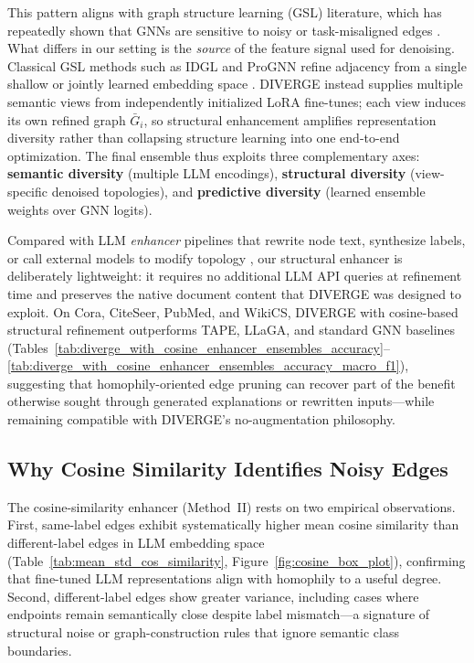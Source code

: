 This pattern aligns with graph structure learning (GSL) literature, which has repeatedly
shown that GNNs are sensitive to noisy or task-misaligned edges
\citep{jin2020prognn,chen2020idgl,dong2023gps}. What differs in our setting is the
\emph{source} of the feature signal used for denoising. Classical GSL methods such as
IDGL and ProGNN refine adjacency from a single shallow or jointly learned embedding
space \citep{chen2020idgl,jin2020prognn}. DIVERGE instead supplies multiple semantic
views from independently initialized LoRA fine-tunes; each view induces its own refined
graph $\bar{G}_i$, so structural enhancement amplifies representation diversity rather
than collapsing structure learning into one end-to-end optimization. The final ensemble
thus exploits three complementary axes: \textbf{semantic diversity} (multiple LLM
encodings), \textbf{structural diversity} (view-specific denoised topologies), and
\textbf{predictive diversity} (learned ensemble weights over GNN logits).

Compared with LLM \emph{enhancer} pipelines that rewrite node text, synthesize labels,
or call external models to modify topology
\citep{he2024harnessing,Sun2026TopologicalEnhancerTAG,guo2024graphedit,zhang2025leveraging},
our structural enhancer is deliberately lightweight: it requires no additional LLM API
queries at refinement time and preserves the native document content that DIVERGE was
designed to exploit. On Cora, CiteSeer, PubMed, and WikiCS, DIVERGE with cosine-based
structural refinement outperforms TAPE, LLaGA, and standard GNN baselines
(Tables~\ref{tab:diverge_with_cosine_enhancer_ensembles_accuracy}--\ref{tab:diverge_with_cosine_enhancer_ensembles_accuracy_macro_f1}),
suggesting that homophily-oriented edge pruning can recover part of the benefit otherwise
sought through generated explanations or rewritten inputs---while remaining compatible
with DIVERGE's no-augmentation philosophy.


\subsection{Why Cosine Similarity Identifies Noisy Edges}
\label{sec:disc-cosine}

The cosine-similarity enhancer (Method~II) rests on two empirical observations. First,
same-label edges exhibit systematically higher mean cosine similarity than
different-label edges in LLM embedding space (Table~\ref{tab:mean_std_cos_similarity},
Figure~\ref{fig:cosine_box_plot}), confirming that fine-tuned LLM representations align
with homophily to a useful degree. Second, different-label edges show greater variance,
including cases where endpoints remain semantically close despite label mismatch---a
signature of structural noise or graph-construction rules that ignore semantic class
boundaries.

